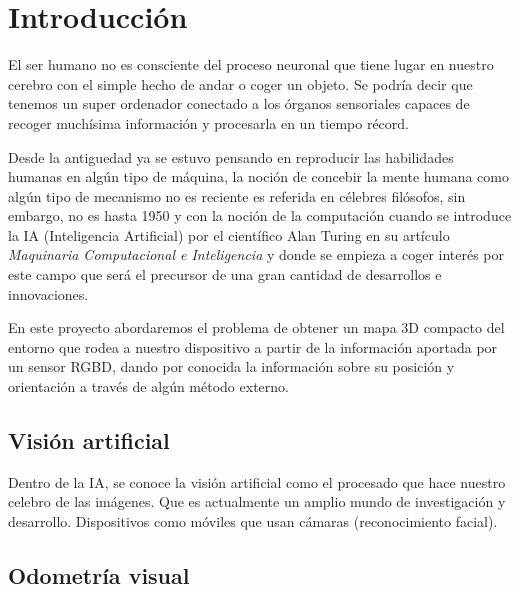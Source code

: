 
\chapter{Introducción} %

\label{Chapter1} %

El ser humano no es consciente del proceso neuronal que tiene lugar en nuestro cerebro con el simple hecho de andar o coger un objeto. Se podría decir que tenemos un super ordenador conectado a los órganos sensoriales capaces de recoger muchísima información y procesarla en un tiempo récord.

Desde la antiguedad ya se estuvo pensando en reproducir las habilidades humanas en algún tipo de máquina, la noción de concebir la mente humana como algún tipo de mecanismo no es reciente es referida en célebres filósofos, sin embargo, no es hasta 1950 y con la noción de la computación cuando se introduce la IA (Inteligencia Artificial) por el científico Alan Turing en su artículo \textit{Maquinaria Computacional e Inteligencia} y donde se empieza a coger interés por este campo que será el precursor de una gran cantidad de desarrollos e innovaciones.

En este proyecto abordaremos el problema de obtener un mapa 3D compacto del
entorno que rodea a nuestro dispositivo a partir de la información aportada por un
sensor RGBD, dando por conocida la información sobre su posición y orientación a
través de algún método externo.

\section{Visión artificial}

Dentro de la IA, se conoce la visión artificial como el procesado que hace nuestro celebro de las imágenes. Que es actualmente un amplio mundo de investigación y desarrollo. Dispositivos como móviles que usan cámaras (reconocimiento facial).

\section{Odometría visual}

